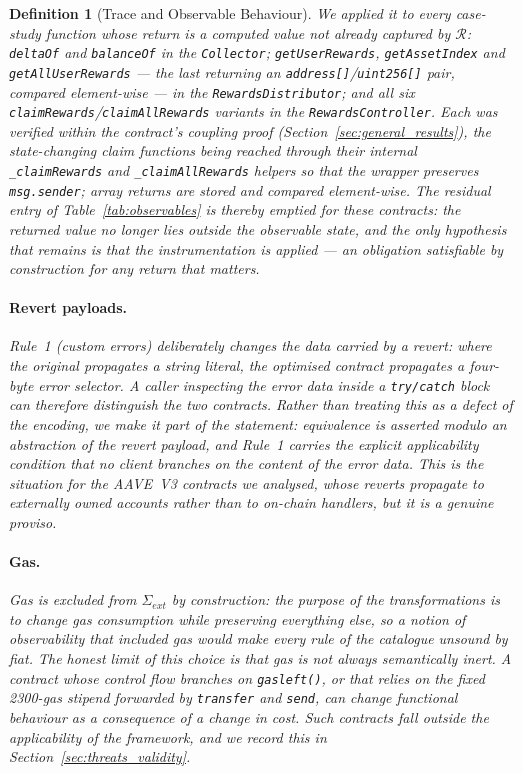\documentclass[manuscript,screen,review]{acmart}
\newenvironment{revisedblock}{\color{red}}{}
\newtheorem{definition}{Definition}
\begin{document}
\begin{definition}[Trace and Observable Behaviour]
\begin{revisedblock}
We applied it to every case-study function whose return is a computed value not
already captured by $\mathcal{R}$: \texttt{deltaOf} and \texttt{balanceOf} in the
\texttt{Collector}; \texttt{getUserRewards}, \texttt{getAssetIndex} and
\texttt{getAllUserRewards} --- the last returning an
\texttt{address[]}/\texttt{uint256[]} pair, compared element-wise --- in the
\texttt{RewardsDistributor}; and all six
\texttt{claimRewards}/\texttt{claimAllRewards} variants in the
\texttt{RewardsController}. Each was verified within the contract's coupling
proof (Section~\ref{sec:general_results}), the state-changing claim functions
being reached through their internal \texttt{\_claimRewards} and
\texttt{\_claimAllRewards} helpers so that the wrapper preserves
\texttt{msg.sender}; array returns are stored and compared element-wise. The
residual entry of Table~\ref{tab:observables} is thereby emptied for these
contracts: the returned value no longer lies outside the observable state, and
the only hypothesis that remains is that the instrumentation is applied --- an
obligation satisfiable by construction for any return that matters.

\paragraph{Revert payloads.}
Rule~1 (custom errors) deliberately changes the data carried by a revert: where
the original propagates a string literal, the optimised contract propagates a
four-byte error selector. A caller inspecting the error data inside a
\texttt{try/catch} block can therefore distinguish the two contracts. Rather
than treating this as a defect of the encoding, we make it part of the
statement: equivalence is asserted modulo an abstraction of the revert payload,
and Rule~1 carries the explicit applicability condition that no client branches
on the content of the error data. This is the situation for the AAVE~V3
contracts we analysed, whose reverts propagate to externally owned accounts
rather than to on-chain handlers, but it is a genuine proviso.

\paragraph{Gas.}
Gas is excluded from $\Sigma_{ext}$ by construction: the purpose of the
transformations is to change gas consumption while preserving everything else,
so a notion of observability that included gas would make every rule of the
catalogue unsound by fiat. The honest limit of this choice is that gas is not
always semantically inert. A contract whose control flow branches on
\texttt{gasleft()}, or that relies on the fixed 2300-gas stipend forwarded by
\texttt{transfer} and \texttt{send}, can change functional behaviour as a
consequence of a change in cost. Such contracts fall outside the applicability
of the framework, and we record this in Section~\ref{sec:threats_validity}.


\end{revisedblock}
\end{definition}
\end{document}
